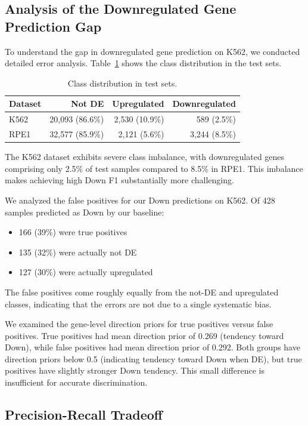 \documentclass[11pt]{article}
\begin{document}
\subsection{Analysis of the Downregulated Gene Prediction Gap}

To understand the gap in downregulated gene prediction on K562, we conducted detailed error analysis. Table~\ref{tab:class_distribution} shows the class distribution in the test sets.

\begin{table}[h]
\centering
\caption{Class distribution in test sets.}
\label{tab:class_distribution}
\begin{tabular}{lrrr}
\toprule
Dataset & Not DE & Upregulated & Downregulated \\
\midrule
K562 & 20,093 (86.6\%) & 2,530 (10.9\%) & 589 (2.5\%) \\
RPE1 & 32,577 (85.9\%) & 2,121 (5.6\%) & 3,244 (8.5\%) \\
\bottomrule
\end{tabular}
\end{table}

The K562 dataset exhibits severe class imbalance, with downregulated genes comprising only 2.5\% of test samples compared to 8.5\% in RPE1. This imbalance makes achieving high Down F1 substantially more challenging.

We analyzed the false positives for our Down predictions on K562. Of 428 samples predicted as Down by our baseline:
\begin{itemize}
    \item 166 (39\%) were true positives
    \item 135 (32\%) were actually not DE
    \item 127 (30\%) were actually upregulated
\end{itemize}

The false positives come roughly equally from the not-DE and upregulated classes, indicating that the errors are not due to a single systematic bias.

We examined the gene-level direction priors for true positives versus false positives. True positives had mean direction prior of 0.269 (tendency toward Down), while false positives had mean direction prior of 0.292. Both groups have direction priors below 0.5 (indicating tendency toward Down when DE), but true positives have slightly stronger Down tendency. This small difference is insufficient for accurate discrimination.

\subsection{Precision-Recall Tradeoff}
\end{document}
